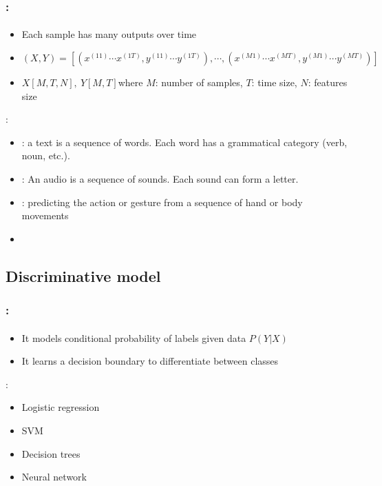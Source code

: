 \documentclass[xcolor=table]{beamer}
\begin{document}
\begin{frame}
	\frametitle{\insertshortsubtitle: \insertsection}
	\framesubtitle{\insertsubsection}
	
	\begin{itemize}
		\item Each sample has many outputs over time
		\item $ (X, Y)= [(x^{(11)}\cdots x^{(1T)}, y^{(11)}\cdots y^{(1T)}), \cdots, (x^{(M1)}\cdots x^{(MT)}, y^{(M1)}\cdots y^{(MT)})]$
		\item $ X[M, T, N],\ Y[M, T] $\linebreak where $ M $: number of samples, $T$: time size, $ N $: features size
	\end{itemize}
	
	\vfill
	:
	\begin{itemize}
		\item {}: a text is a sequence of words. Each word has a grammatical category (verb, noun, etc.).
		\item {}: An audio is a sequence of sounds. Each sound can form a letter.
		\item {}: predicting the action or gesture from a sequence of hand or body movements
		\item {}
	\end{itemize}
	
\end{frame}

\subsection{Discriminative model}

\begin{frame}
	\frametitle{\insertshortsubtitle: \insertsection}
	\framesubtitle{\insertsubsection}

	\begin{itemize}
		\item It models conditional probability of labels given data $P(Y|X)$ 
		\item It learns a decision boundary to differentiate between classes
	\end{itemize}
	
	\vfill
	:
	\begin{itemize}
		\item Logistic regression
		\item SVM
		\item Decision trees
		\item Neural network
	\end{itemize}
	
\end{frame}
\end{document}
